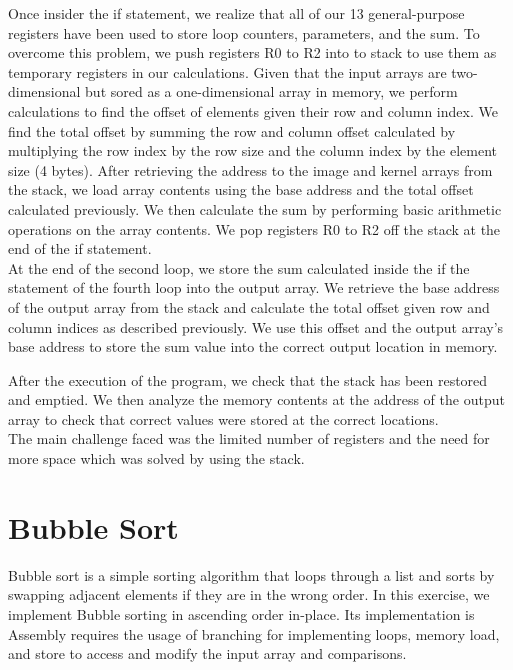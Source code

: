 \documentclass[10pt]{article}
\begin{document}
Once insider the if statement, we realize that all of our 13 general-purpose registers have been used to store loop counters, parameters, and the sum. To overcome this problem, we push registers R0 to R2 into to stack to use them as temporary registers in our calculations. Given that the input arrays are two-dimensional but sored as a one-dimensional array in memory, we perform calculations to find the offset of elements given their row and column index. We find the total offset by summing the row and column offset calculated by multiplying the row index by the row size and the column index by the element size (4 bytes). After retrieving the address to the image and kernel arrays from the stack, we load array contents using the base address and the total offset calculated previously. We then calculate the sum by performing basic arithmetic operations on the array contents. We pop registers R0 to R2 off the stack at the end of the if statement.\\

At the end of the second loop, we store the sum calculated inside the if the statement of the fourth loop into the output array. We retrieve the base address of the output array from the stack and calculate the total offset given row and column indices as described previously. We use this offset and the output array's base address to store the sum value into the correct output location in memory.

After the execution of the program, we check that the stack has been restored and emptied. We then analyze the memory contents at the address of the output array to check that correct values were stored at the correct locations.\\

The main challenge faced was the limited number of registers and the need for more space which was solved by using the stack.
\section{Bubble Sort}
Bubble sort is a simple sorting algorithm that loops through a list and sorts by swapping adjacent elements if they are in the wrong order. In this exercise, we implement Bubble sorting in ascending order in-place.  Its implementation is Assembly requires the usage of branching for implementing loops, memory load, and store to access and modify the input array and comparisons.\\
\end{document}
